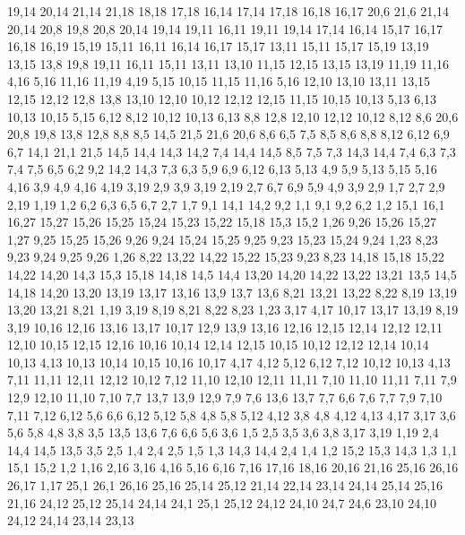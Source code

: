 19,14
20,14
21,14
21,18
18,18
17,18
%
16,14
17,14
17,18
16,18
16,17
%
20,6
21,6
21,14
20,14
20,8
%
19,8
20,8
20,14
19,14
19,11
%
16,11
19,11
19,14
17,14
16,14
%
15,17
16,17
16,18
16,19
15,19
%
15,11
16,11
16,14
16,17
15,17
%
13,11
15,11
15,17
15,19
13,19
13,15
%
13,8
19,8
19,11
16,11
15,11
13,11
13,10
%
11,15
12,15
13,15
13,19
11,19
11,16
%
4,16
5,16
11,16
11,19
4,19
%
5,15
10,15
11,15
11,16
5,16
%
12,10
13,10
13,11
13,15
12,15
12,12
%
12,8
13,8
13,10
12,10
%
10,12
12,12
12,15
11,15
10,15
10,13
%
5,13
6,13
10,13
10,15
5,15
%
6,12
8,12
10,12
10,13
6,13
%
8,8
12,8
12,10
12,12
10,12
8,12
%
8,6
20,6
20,8
19,8
13,8
12,8
8,8
%
8,5
14,5
21,5
21,6
20,6
8,6
%
6,5
7,5
8,5
8,6
8,8
8,12
6,12
6,9
6,7
%
14,1
21,1
21,5
14,5
14,4
14,3
14,2
%
7,4
14,4
14,5
8,5
7,5
%
7,3
14,3
14,4
7,4
%
6,3
7,3
7,4
7,5
6,5
%
6,2
9,2
14,2
14,3
7,3
6,3
%
5,9
6,9
6,12
6,13
5,13
%
4,9
5,9
5,13
5,15
5,16
4,16
%
3,9
4,9
4,16
4,19
3,19
%
2,9
3,9
3,19
2,19
%
2,7
6,7
6,9
5,9
4,9
3,9
2,9
%
1,7
2,7
2,9
2,19
1,19
%
1,2
6,2
6,3
6,5
6,7
2,7
1,7
%
9,1
14,1
14,2
9,2
%
1,1
9,1
9,2
6,2
1,2
15,1
16,1
16,27
15,27
15,26
15,25
15,24
15,23
15,22
15,18
15,3
15,2
%
1,26
9,26
15,26
15,27
1,27
%
9,25
15,25
15,26
9,26
%
9,24
15,24
15,25
9,25
%
9,23
15,23
15,24
9,24
%
1,23
8,23
9,23
9,24
9,25
9,26
1,26
%
8,22
13,22
14,22
15,22
15,23
9,23
8,23
%
14,18
15,18
15,22
14,22
14,20
%
14,3
15,3
15,18
14,18
14,5
14,4
%
13,20
14,20
14,22
13,22
13,21
%
13,5
14,5
14,18
14,20
13,20
13,19
13,17
13,16
13,9
13,7
13,6
%
8,21
13,21
13,22
8,22
%
8,19
13,19
13,20
13,21
8,21
%
1,19
3,19
8,19
8,21
8,22
8,23
1,23
%
3,17
4,17
10,17
13,17
13,19
8,19
3,19
%
10,16
12,16
13,16
13,17
10,17
%
12,9
13,9
13,16
12,16
12,15
12,14
12,12
12,11
12,10
%
10,15
12,15
12,16
10,16
%
10,14
12,14
12,15
10,15
%
10,12
12,12
12,14
10,14
10,13
%
4,13
10,13
10,14
10,15
10,16
10,17
4,17
%
4,12
5,12
6,12
7,12
10,12
10,13
4,13
%
7,11
11,11
12,11
12,12
10,12
7,12
%
11,10
12,10
12,11
11,11
%
7,10
11,10
11,11
7,11
%
7,9
12,9
12,10
11,10
7,10
%
7,7
13,7
13,9
12,9
7,9
%
7,6
13,6
13,7
7,7
%
6,6
7,6
7,7
7,9
7,10
7,11
7,12
6,12
%
5,6
6,6
6,12
5,12
5,8
%
4,8
5,8
5,12
4,12
%
3,8
4,8
4,12
4,13
4,17
3,17
%
3,6
5,6
5,8
4,8
3,8
%
3,5
13,5
13,6
7,6
6,6
5,6
3,6
%
1,5
2,5
3,5
3,6
3,8
3,17
3,19
1,19
%
2,4
14,4
14,5
13,5
3,5
2,5
%
1,4
2,4
2,5
1,5
%
1,3
14,3
14,4
2,4
1,4
%
1,2
15,2
15,3
14,3
1,3
%
1,1
15,1
15,2
1,2
1,16
2,16
3,16
4,16
5,16
6,16
7,16
17,16
18,16
20,16
21,16
25,16
26,16
26,17
1,17
%
25,1
26,1
26,16
25,16
25,14
25,12
%
21,14
22,14
23,14
24,14
25,14
25,16
21,16
%
24,12
25,12
25,14
24,14
%
24,1
25,1
25,12
24,12
24,10
24,7
24,6
%
23,10
24,10
24,12
24,14
23,14
23,13
%

